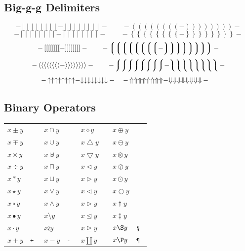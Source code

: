 \documentclass[11pt, a4paper, oneside]{article}
\theoremstyle{Plain}
\theoremstyle{Definition}
\theoremstyle{Remark}
\begin{document}
\begin{appendix}
	\subsection{Big-g-g Delimiters \showfamily}

	\def\testdelim#1#2{%
	  - \left#1\left#1\left#1\left#1\left#1\left#1\left#1\left#1 -
	  \right#2\right#2\right#2\right#2\right#2\right#2\right#2\right#2 -}

	\begingroup
	\delimitershortfall-1pt
	\begin{displaymath}
	  \testdelim\lfloor\rfloor
	  \qquad
	  \testdelim()
	\end{displaymath}
	\begin{displaymath}
	  \testdelim\lceil\rceil
	  \qquad
	  \testdelim\{\}
	\end{displaymath}
	\begin{displaymath}
	  \testdelim[]
	  \qquad
	  \testdelim\lgroup\rgroup
	\end{displaymath}
	\begin{displaymath}
	  \testdelim\langle\rangle
	  \qquad
	  \testdelim\lmoustache\rmoustache
	\end{displaymath}
	\begin{displaymath}
	  \testdelim\uparrow\downarrow \quad
	  \testdelim\Uparrow\Downarrow \quad
	\end{displaymath}
	\endgroup %

	\def\X#1{$x #1 y$ &\tt\string#1}
	\def\Y#1{$\big#1$ &\tt\string#1}
	\def\Z#1{$x #1 y$}
	\def\W#1#2{$#1{#2}$ &\tt\string#1\string{#2\string}}

	\subsection{Binary Operators \showfamily}

	\begin{tabular}{*8l}
	\X\pm           &\X\cap         &\X\diamond             &\X\oplus     \\
	\X\mp           &\X\cup         &\X\bigtriangleup       &\X\ominus    \\
	\X\times        &\X\uplus       &\X\bigtriangledown     &\X\otimes    \\
	\X\div          &\X\sqcap       &\X\triangleleft        &\X\oslash    \\
	\X\ast          &\X\sqcup       &\X\triangleright       &\X\odot      \\
	\X\star         &\X\vee         &\X\lhd                 &\X\bigcirc   \\
	\X\circ         &\X\wedge       &\X\rhd                 &\X\dagger    \\
	\X\bullet       &\X\setminus    &\X\unlhd               &\X\ddagger   \\
	\X\cdot         &\X\wr          &\X\unrhd               &\X\S         \\
	\X+             &\X-            &\X\amalg               &\X\P
	\end{tabular}


\end{appendix}
\end{document}
